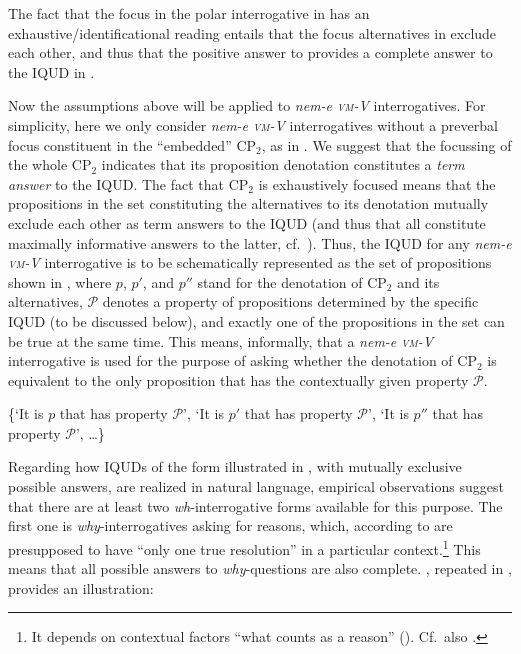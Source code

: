 \documentclass[output=paper,colorlinks,citecolor=brown]{langscibook}
\begin{document}
	\noindent The fact that the focus in the polar interrogative  in  has an exhaustive/identificational reading  entails that the focus alternatives in  exclude each other, and thus that the  positive answer to   provides a complete answer to the IQUD in . 
	
	
	Now the assumptions above will be applied to \textit{nem-e \textsc{vm}-V} interrogatives. For simplicity, here we only consider  \textit{nem-e \textsc{vm}-V} interrogatives without a preverbal focus constituent in the ``embedded'' CP$_2$, as in  .
	We suggest that the focussing of the whole  CP$_2$ indicates that its proposition denotation constitutes a  \textit{term answer} to the IQUD. 
	The fact that CP$_2$ is  exhaustively focused means that the propositions in the set constituting the alternatives to its denotation mutually exclude each other as term answers to the IQUD (and thus that all constitute  maximally informative answers to the latter, cf.~\citealt{dayal1996}). Thus, the IQUD for any \textit{nem-e \textsc{vm}-V} interrogative is to be schematically represented as the set of propositions shown in , where $p$, $p'$, and $p''$ stand for the denotation of CP$_2$ and its alternatives, $\mathcal{P}$ denotes a property of propositions determined by the specific IQUD (to be discussed below), and exactly one of the propositions in the set can be true at the same time. This means, informally,  that a \textit{nem-e \textsc{vm}-V} interrogative is used for the purpose of asking whether  the denotation of CP$_2$ is equivalent to the only proposition that has the contextually given  property $\mathcal{P}$. 
	
	\ea\label{ex:QUD-den} \{`It is $p$ that has property $\mathcal{P}$', `It is $p'$ that has property $\mathcal{P}$', `It is $p''$ that has property $\mathcal{P}$', \dots\}
	\z
	
	
	Regarding how IQUDs of the form illustrated in , with mutually exclusive possible answers, are realized in natural language, empirical observations suggest that there are at least two \textit{wh}-interrogative forms available for this purpose. The first one is \textit{why}-interrogatives asking for reasons, which, according to \citet[152]{oshima2007} are presupposed to have ``only one true resolution''  in a particular context.\footnote{It depends on contextual factors ``what counts as a reason'' (\citealt[155]{oshima2007}). Cf.~also \citet{unger1977}.} This means that all possible answers to \textit{why}-questions are also complete. , repeated in , provides an illustration:
	
\end{document}

